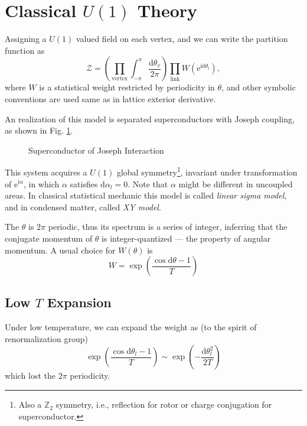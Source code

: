 
\section{Classical $U(1)$ Theory}

Assigning a $U(1)$ valued field on each vertex, and we can write the partition function as
\begin{equation}
  \mathcal{Z} = \left( \prod_{\text{vertex}} \int_{-\pi }^{\pi } \frac{\mathrm{d} \theta_{v}}{2\pi } \right) \prod_{\text{link}} W \left( \mathrm{e}^{\mathrm{i} \mathrm{d}  \theta_{l}} \right),
\end{equation}
where $W$ is a statistical weight restricted by periodicity in $\theta$, and other symbolic conventions are used same as in lattice exterior derivative.

An realization of this model is separated superconductors with Joseph coupling, as shown in Fig. \ref{fig:superconductor-of-joseph-interaction}.
\begin{figure}[ht]
    \centering
    \caption{Superconductor of Joseph Interaction}
    \label{fig:superconductor-of-joseph-interaction}
\end{figure}

This system acquires a $U(1)$ global symmetry\footnote{
  Also a $\mathbb{Z}_2$ symmetry, i.e., reflection for rotor or charge conjugation for superconductor.
}, invariant under transformation of $\mathrm{e}^{\mathrm{i}\alpha}$, in which $\alpha$ satisfies $\mathrm{d} \alpha _{l} = 0$. Note that $\alpha$ might be different in uncoupled areas.
In classical statistical mechanic this model is called \emph{linear sigma model}, and in condensed matter, called \emph{XY model}.

The $\theta$ is $2\pi $ periodic, thus its spectrum is a series of integer, inferring that the conjugate momentum of $\theta$ is integer-quantized --- the property of angular momentum.
A usual choice for $W(\theta)$ is 
\begin{equation}
  W = \exp \left( \frac{\cos \mathrm{d} \theta -1}{T} \right)
\end{equation}

\subsection{Low $T$ Expansion}

Under low temperature, we can expand the weight as (to the spirit of renormalization group)
\begin{equation}
  \exp \left( \frac{\cos  \mathrm{d} \theta_{l} - 1}{T} \right) \sim \exp \left( - \frac{\mathrm{d} \theta_{l}^{2}}{2T} \right) 
\end{equation}
which lost the $2\pi $ periodicity.

